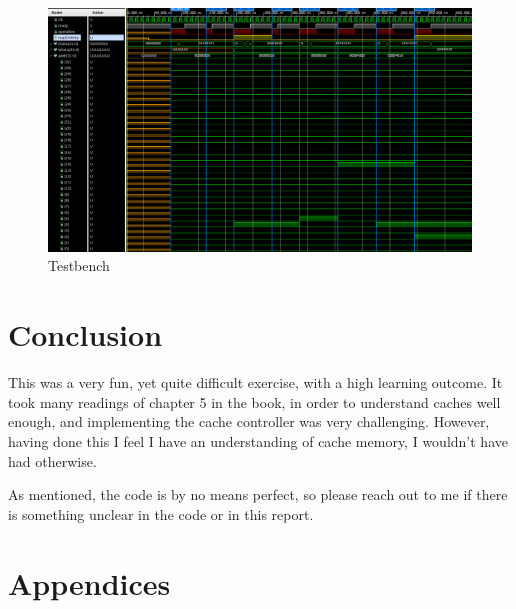 \documentclass{article}
\begin{document}
\begin{figure}[H]
 \centering
  \includegraphics[width=400pt]{img/testbench1.png}
 \caption{Testbench}
  \label{TESTBENCH1}
 \end{figure}



\section{Conclusion}
This was a very fun, yet quite difficult exercise, with a high learning outcome. It took many readings of chapter 5 in the book, in order to understand caches well enough, and implementing the cache controller was very challenging. However, having done this I feel I have an understanding of cache memory, I wouldn't have had otherwise. 

As mentioned, the code is by no means perfect, so please reach out to me if there is something unclear in the code or in this report. 

\section{Appendices}
\end{document}
